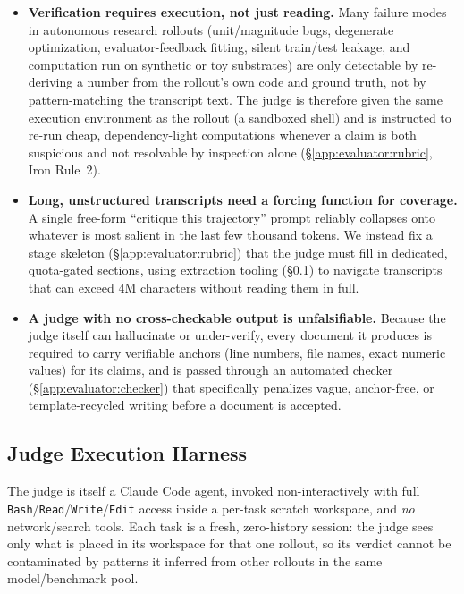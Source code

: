\begin{itemize}
  \item \textbf{Verification requires execution, not just reading.} Many
  failure modes in autonomous research rollouts (unit/magnitude bugs,
  degenerate optimization, evaluator-feedback fitting, silent train/test
  leakage, and computation run on synthetic or toy substrates) are only
  detectable by re-deriving a number from the rollout's own code and
  ground truth, not by pattern-matching the transcript text. The judge is
  therefore given the same execution environment as the rollout (a
  sandboxed shell) and is instructed to re-run cheap, dependency-light
  computations whenever a claim is both suspicious and not resolvable by
  inspection alone (\S\ref{app:evaluator:rubric}, Iron Rule~2).

  \item \textbf{Long, unstructured transcripts need a forcing function
  for coverage.} A single free-form ``critique this trajectory'' prompt
  reliably collapses onto whatever is most salient in the last few
  thousand tokens. We instead fix a stage skeleton
  (\S\ref{app:evaluator:rubric}) that the judge must fill in dedicated,
  quota-gated sections, using extraction tooling
  (\S\ref{app:evaluator:harness}) to navigate transcripts that can exceed
  4M characters without reading them in full.

  \item \textbf{A judge with no cross-checkable output is unfalsifiable.}
  Because the judge itself can hallucinate or under-verify, every document
  it produces is required to carry verifiable anchors (line numbers, file
  names, exact numeric values) for its claims, and is passed through an
  automated checker (\S\ref{app:evaluator:checker}) that specifically
  penalizes vague, anchor-free, or template-recycled writing before a
  document is accepted.
\end{itemize}

\subsection{Judge Execution Harness}
\label{app:evaluator:harness}

The judge is itself a Claude Code agent, invoked non-interactively with
full \texttt{Bash}/\texttt{Read}/\texttt{Write}/\texttt{Edit} access inside
a per-task scratch workspace, and \emph{no} network/search tools. Each
task is a fresh, zero-history session: the judge sees only what is placed
in its workspace for that one rollout, so its verdict cannot be
contaminated by patterns it inferred from other rollouts in the same
model/benchmark pool.

